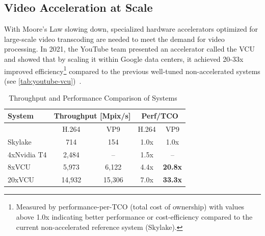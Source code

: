 \subsection{Video Acceleration at Scale}

With Moore's Law slowing down, specialized hardware accelerators optimized for large-scale video transcoding are needed to meet the demand for video processing. 
In 2021, the YouTube team presented an accelerator called the \ac{VCU} and showed that by scaling it within Google data centers, it achieved 20-33x improved efficiency\footnote{Measured by performance-per-TCO (total cost of ownership) with values above 1.0x indicating better performance or cost-efficiency compared to the current non-accelerated reference system (Skylake).} compared to the previous well-tuned non-accelerated systems (see \autoref{tab:youtube-vcu})~\parencite{youtube_infrastructure}.

\begin{table}[h!]
\centering
\caption{Throughput and Performance Comparison of Systems~\parencite{youtube_vpu}}\label{tab:youtube-vcu}
\begin{tabular}{|l|cc|cc|}
\hline
\textbf{System}      & \multicolumn{2}{c|}{\textbf{Throughput [Mpix/s]}} & \multicolumn{2}{c|}{\textbf{Perf/TCO}}    \\ \hline
            & \multicolumn{1}{c|}{H.264}       & VP9       & \multicolumn{1}{c|}{H.264} & VP9 \\ \hline
Skylake     & \multicolumn{1}{c|}{714}            & 154           & \multicolumn{1}{c|}{1.0x}      & 1.0x     \\ \hline
4xNvidia T4 & \multicolumn{1}{c|}{2,484}          & --            & \multicolumn{1}{c|}{1.5x}      & --       \\ \hline
8xVCU       & \multicolumn{1}{c|}{5,973}          & 6,122         & \multicolumn{1}{c|}{4.4x}      & \textbf{20.8x}    \\ \hline
20xVCU      & \multicolumn{1}{c|}{14,932}         & 15,306        & \multicolumn{1}{c|}{7.0x}      & \textbf{33.3x}    \\ \hline
\end{tabular}
\end{table}

